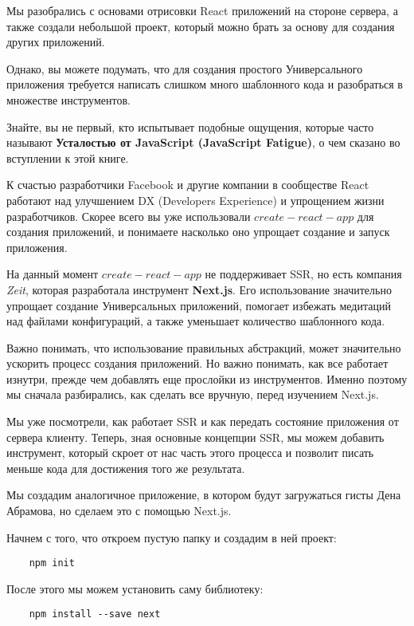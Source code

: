 Мы разобрались с основами отрисовки React приложений на стороне сервера, а также создали небольшой проект, который можно брать за основу для создания других приложений.

Однако, вы можете подумать, что для создания простого Универсального приложения требуется написать слишком много шаблонного кода и разобраться в множестве инструментов.

Знайте, вы не первый, кто испытывает подобные ощущения, которые часто называют \textbf{Усталостью от JavaScript (JavaScript Fatigue)}, о чем сказано во вступлении к этой книге.

К счастью разработчики Facebook и другие компании в сообществе React работают над улучшением DX (Developers Experience) и упрощением жизни разработчиков. Скорее всего вы уже использовали $create-react-app$ для создания приложений, и понимаете насколько оно упрощает создание и запуск приложения. 

На данный момент $create-react-app$ не поддерживает SSR, но есть компания \textit{Zeit}, которая разработала инструмент \textbf{Next.js}. Его использование значительно упрощает создание Универсальных приложений, помогает избежать медитаций над файлами конфигураций, а также уменьшает количество шаблонного кода.

Важно понимать, что использование правильных абстракций, может значительно ускорить процесс создания приложений. Но важно понимать, как все работает изнутри, прежде чем добавлять еще прослойки из инструментов. Именно поэтому мы сначала разбирались, как сделать все вручную, перед изучением Next.js.

Мы уже посмотрели, как работает SSR и как передать состояние приложения от сервера клиенту. Теперь, зная основные концепции SSR, мы можем добавить инструмент, который скроет от нас часть этого процесса и позволит писать меньше кода для достижения того же результата.

Мы создадим аналогичное приложение, в котором будут загружаться гисты Дена Абрамова, но сделаем это с помощью Next.js.

Начнем с того, что откроем пустую папку и создадим в ней проект:

\begin{lstlisting}
	npm init
\end{lstlisting}

После этого мы можем установить саму библиотеку:

\begin{lstlisting}
	npm install --save next
\end{lstlisting}

